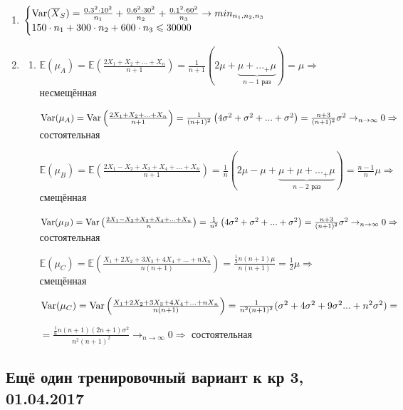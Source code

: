 \documentclass[12pt, a4paper]{article}\usepackage[]{graphicx}\usepackage[]{color}
\begin{document}
\begin{enumerate}
	\item 
	   $
		\begin{cases}
			\operatorname{Var}(\overline{X}_S) = \frac{0.3^2\cdot 10^2}{n_1} + \frac{0.6^2 \cdot 30^2}{n_2} + \frac{0.1^2 \cdot 60^2}{n_3} \to min_{n_1, n_2, n_3} \\
			150\cdot n_1 + 300 \cdot n_2 + 600 \cdot n_3 \leqslant 30000
		\end{cases}
	   $
	
	\item 
		\begin{enumerate}
			\item $\mathbb{E}(\mu_A) = \mathbb{E}\left(\frac{2X_1 + X_2 + ... + X_n}{n+1}\right) = \frac{1}{n+1} \left(2\mu + \underbrace{\mu + ... _+ \mu}_{n-1 \text{ раз}}\right) = \mu \Rightarrow$  несмещённая
			
			$\operatorname{Var}(\mu_A) = \operatorname{Var}\left(\frac{2X_1 + X_2 + ... + X_n}{n+1}\right) = \frac{1}{(n+1)^2}\left(4\sigma^2 + \sigma^2 + ... + \sigma^2\right) = \frac{n+3}{(n+1)^2} \sigma^2 \to_{n \to \infty} 0 \Rightarrow$ состоятельная
			
			$\mathbb{E}(\mu_B) = \mathbb{E}\left(\frac{2X_1 - X_2 + X_3 + X_4 + ... + X_n}{n+1}\right) = \frac{1}{n} \left(2\mu - \mu + \underbrace{\mu + \mu + ... _+ \mu}_{n-2 \text{ раз}}\right) = \frac{n-1}{n}\mu \Rightarrow$ смещённая
			
			$\operatorname{Var}(\mu_B) = \operatorname{Var}\left(\frac{2X_1 - X_2 + X_3 + X_4 + ... + X_n}{n}\right) = \frac{1}{n^2}\left(4\sigma^2 + \sigma^2 + ... + \sigma^2\right) = \frac{n+3}{(n+1)^2} \sigma^2 \to_{n \to \infty} 0 \Rightarrow$ состоятельная
			
			$\mathbb{E}(\mu_C) = \mathbb{E}\left(\frac{X_1 + 2X_2 + 3X_3 + 4X_4 + ... +n X_n}{n(n+1)}\right) = \frac{\frac{1}{2} n(n+1)\mu}{n(n+1)} = \frac{1}{2} \mu \Rightarrow $ смещённая
			
			$\operatorname{Var}(\mu_C) = \operatorname{Var}\left(\frac{X_1 + 2X_2 + 3X_3 + 4X_4 + ... + nX_n}{n(n+1)}\right) = \frac{1}{n^2(n+1)^2}(\sigma^2 + 4\sigma^2 + 9\sigma^2 ... + n^2\sigma^2) = $
			
			$=  \frac{\frac{1}{6}n(n+1)(2n+1)\sigma^2}{n^2(n+1)^2}   \to_{n \to \infty} 0 \Rightarrow$ состоятельная
			
		\end{enumerate}
\end{enumerate}



\subsection{Ещё один тренировочный вариант к кр 3, 01.04.2017}
\end{document}
